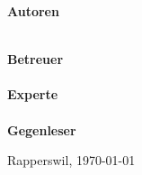 \begin{titlepage}
\begin{minipage}{\linewidth}
	\end{minipage}
	\begin{minipage}{\linewidth}
	\begin{minipage}[t]{0.33\linewidth}
		\Large \textbf{Autoren} \\
		\Large \ubos \\
		\Large \pchr
	\end{minipage}
	\hfill\begin{minipage}[t]{0.5\linewidth}
		\Large \textbf{Betreuer} \\
		\Large \proff \\
		\textbf{\Large Experte}\\
		\Large \examm \\
		\textbf{\Large Gegenleser}\\
		\Large \msto
	\end{minipage}
	\end{minipage}

	\begin{minipage}{0.33\linewidth}

	\end{minipage}
	\begin{minipage}{0.33\linewidth}


	\end{minipage}
	\begin{minipage}{0.33\linewidth}

	\end{minipage}
	\vfill
	\Large Rapperswil, \today

\end{titlepage}

\restoregeometry

